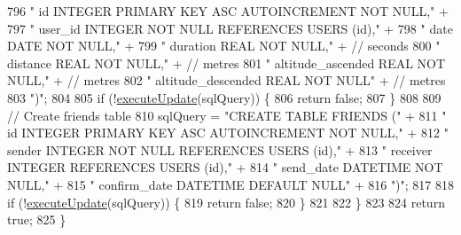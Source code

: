 \begin{DoxyCode}
796                     \textcolor{stringliteral}{"    id                  INTEGER PRIMARY KEY ASC AUTOINCREMENT NOT NULL,"} +
797                     \textcolor{stringliteral}{"    user\_id             INTEGER NOT NULL REFERENCES USERS (id),"} +
798                     \textcolor{stringliteral}{"    date                DATE    NOT NULL,"} +
799                     \textcolor{stringliteral}{"    duration            REAL    NOT NULL,"} + \textcolor{comment}{// seconds}
800                     \textcolor{stringliteral}{"    distance            REAL    NOT NULL,"} + \textcolor{comment}{// metres}
801                     \textcolor{stringliteral}{"    altitude\_ascended   REAL    NOT NULL,"} + \textcolor{comment}{// metres}
802                     \textcolor{stringliteral}{"    altitude\_descended  REAL    NOT NULL"} + \textcolor{comment}{// metres}
803                     \textcolor{stringliteral}{")"};
804 
805             \textcolor{keywordflow}{if} (!\hyperlink{classcom_1_1activitytracker_1_1_d_b_manager_a382397e2bdf309901d1c80ff66be69b7}{executeUpdate}(sqlQuery)) \{
806                 \textcolor{keywordflow}{return} \textcolor{keyword}{false};
807             \}
808 
809             \textcolor{comment}{// Create friends table}
810             sqlQuery = \textcolor{stringliteral}{"CREATE TABLE FRIENDS ("} +
811                     \textcolor{stringliteral}{"    id            INTEGER  PRIMARY KEY ASC AUTOINCREMENT NOT NULL,"} +
812                     \textcolor{stringliteral}{"    sender        INTEGER  NOT NULL REFERENCES USERS (id),"} +
813                     \textcolor{stringliteral}{"    receiver      INTEGER  REFERENCES USERS (id),"} +
814                     \textcolor{stringliteral}{"    send\_date     DATETIME NOT NULL,"} +
815                     \textcolor{stringliteral}{"    confirm\_date  DATETIME DEFAULT NULL"} +
816                     \textcolor{stringliteral}{")"};
817 
818             \textcolor{keywordflow}{if} (!\hyperlink{classcom_1_1activitytracker_1_1_d_b_manager_a382397e2bdf309901d1c80ff66be69b7}{executeUpdate}(sqlQuery)) \{
819                 \textcolor{keywordflow}{return} \textcolor{keyword}{false};
820             \}
821 
822         \}
823 
824         \textcolor{keywordflow}{return} \textcolor{keyword}{true};
825     \}
\end{DoxyCode}
